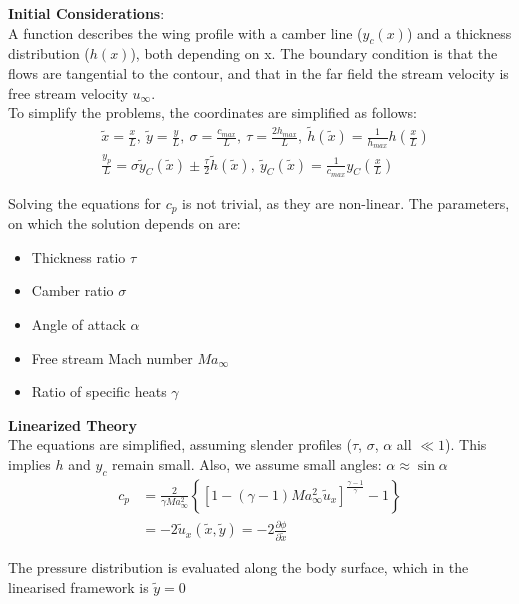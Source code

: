 \documentclass[8pt, landscape, fleqn]{scrartcl}
\begin{document}
\begin{multicols*}{3}
\textbf{Initial Considerations}: \\
A function describes the wing profile with a camber line ($y_c(x)$) and a thickness distribution ($h(x)$), both depending on x. The boundary condition is that the flows are tangential to the contour, and that in the far field the stream velocity is free stream velocity $u_\infty$. \\

To simplify the problems, the coordinates are simplified as follows:
\begin{align*}
   & \tilde{x} = \frac{x}{L},~ \tilde{y} = \frac{y}{L},~ \sigma = \frac{c_{max}}{L},~\tau = \frac{2 h_{max}}{L},~\tilde{h}(\tilde{x}) = \frac{1}{h_{max}} h\left( \frac{x}{L} \right)\\
   & \frac{y_p}{L} = \sigma\tilde{y}_C(\tilde{x}) \pm \frac{\tau}{2} \tilde{h}(\tilde{x}),~\tilde{y}_C(\tilde{x}) = \frac{1}{c_{max}} y_C \left( \frac{x}{L} \right)
\end{align*}

Solving the equations for $c_p$ is not trivial, as they are non-linear. The parameters, on which the solution depends on are:
\begin{itemize}
    \item Thickness ratio $\tau$
    \item Camber ratio $\sigma$
    \item Angle of attack $\alpha$
    \item Free stream Mach number $Ma_\infty$
    \item Ratio of specific heats $\gamma$
\end{itemize}
\textbf{Linearized Theory} \\
The equations are simplified, assuming slender profiles ($\tau$, $\sigma$, $\alpha$ all $\ll 1$). This implies $h$ and $y_c$ remain small. Also, we assume small angles: $\alpha \approx \sin \alpha$
\begin{align*}
    c_p &= \frac{2}{\gamma Ma_\infty^2} \left\{ \left[ 1 - (\gamma-1)Ma_\infty^2 \tilde{u}_x \right]^{\frac{\gamma-1}{\gamma}}-1 \right\} \\
    & = -2 \tilde{u}_x(\tilde{x},\tilde{y}) = -2 \frac{\partial\phi}{\partial\tilde{x}}
\end{align*}

The pressure distribution is evaluated along the body surface, which in the linearised framework is $\tilde{y} = 0$ \\


\end{multicols*}
\end{document}
